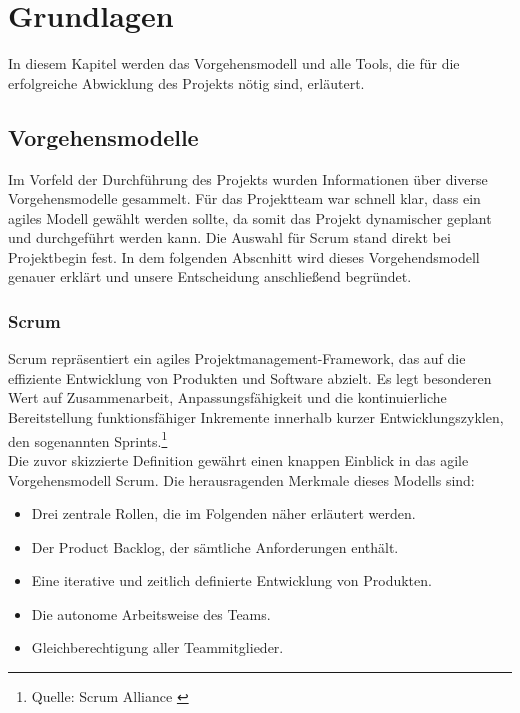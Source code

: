 \chapter{Grundlagen}
In diesem Kapitel werden das Vorgehensmodell und alle Tools, die für die erfolgreiche
Abwicklung des Projekts nötig sind, erläutert.

\section{Vorgehensmodelle}
Im Vorfeld der Durchführung des Projekts wurden Informationen über diverse Vorgehensmodelle
gesammelt. Für das Projektteam war schnell klar, dass ein agiles Modell gewählt werden sollte,
da somit das Projekt dynamischer geplant und durchgeführt werden kann. Die Auswahl für Scrum
stand direkt bei Projektbegin fest. In dem folgenden Abscnhitt wird dieses
Vorgehendsmodell genauer erklärt und unsere Entscheidung anschließend begründet.

\subsection{Scrum}
Scrum repräsentiert ein agiles Projektmanagement-Framework,
das auf die effiziente Entwicklung von Produkten und Software abzielt. Es legt besonderen Wert auf Zusammenarbeit,
Anpassungsfähigkeit und die kontinuierliche Bereitstellung funktionsfähiger Inkremente innerhalb kurzer Entwicklungszyklen,
den sogenannten Sprints.\footnote{Quelle: Scrum Alliance \cite{WHAT-IS-SCRUM}} \\

Die zuvor skizzierte Definition gewährt einen knappen Einblick in das agile Vorgehensmodell Scrum. Die herausragenden Merkmale dieses Modells sind:

\begin{itemize}
    \item Drei zentrale Rollen, die im Folgenden näher erläutert werden.
    \item Der Product Backlog, der sämtliche Anforderungen enthält.
    \item Eine iterative und zeitlich definierte Entwicklung von Produkten.
    \item Die autonome Arbeitsweise des Teams.
    \item Gleichberechtigung aller Teammitglieder.
\end{itemize}

